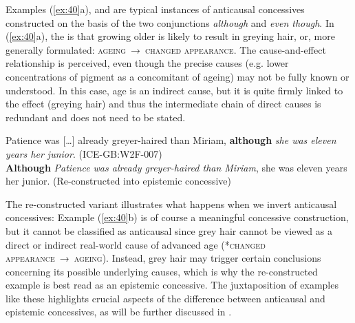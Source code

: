 \begin{sloppypar}
Examples (\ref{ex:40}a),  and  are typical instances of anticausal concessives constructed on the basis of the two conjunctions \textit{although} and \textit{even though}. In (\ref{ex:40}a), the  is that growing older is likely to result in greying hair, or, more generally formulated: \textsc{ageing~}→~\textsc{changed} \textsc{appearance}. The cause-and-effect relation\-ship is perceived, even though the precise causes (e.g. lower concentrations of pigment as a concomitant of ageing) may not be fully known or understood. In this case, age is an indirect cause, but it is quite firmly linked to the effect (greying hair) and thus the intermediate chain of direct causes is redundant and does not need to be stated.
\end{sloppypar}

\ea\label{ex:40}
    \ea\label{bkm:Ref487265706}Patience was […] already greyer-haired than Miriam, \textbf{although} \textit{she was eleven years her junior}. (ICE-GB:W2F-007)\\
    \ex\label{ex:40b} \textbf{Although} \textit{Patience was already greyer-haired than Miriam}, she was eleven years her junior. (Re-constructed into epistemic concessive)\\
\z
\z

\begin{sloppypar}
The re-constructed variant illustrates what happens when we invert anticausal concessives: Example (\ref{ex:40}b) is of course a meaningful concessive construction, but it cannot be classified as anticausal since grey hair cannot be viewed as a direct or indirect real-world cause of advanced age (*\textsc{changed} \textsc{appearance~}→~\textsc{ageing}). Instead, grey hair may trigger certain conclusions concerning its possible underlying causes, which is why the re-constructed example is best read as an epistemic concessive. The juxtaposition of examples like these highlights crucial aspects of the difference between anticausal and epistemic concessives, as will be further discussed in .
\end{sloppypar}


